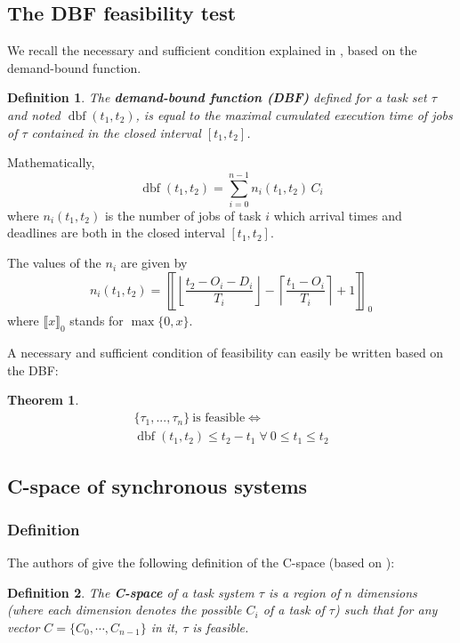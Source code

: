 \documentclass[conference]{IEEEtran}
\newtheorem{theorem}{Theorem}
\newtheorem{definition}{Definition}
\newcommand{\dbf}[1]{\operatorname{dbf}(#1)}
\begin{document}
	\subsection{The DBF feasibility test}

	We recall the necessary and sufficient condition explained in \cite{baruah1999generalized, baruah1990algorithms,pellizzoni2005feasibility}, based on the demand-bound function.

	\begin{definition}
		The \textbf{demand-bound function (DBF)}
		defined for a task set $\tau$ and noted $\dbf{t_1, t_2}$, is equal to
		the maximal cumulated execution time of jobs of $\tau$ contained in the
		closed interval $[t_1, t_2]$.
	\end{definition}

	Mathematically,
	\[
		\dbf{t_1, t_2} = \sum_{i=0}^{n-1} n_i(t_1, t_2) \, C_i
	\]
	where $n_i(t_1, t_2)$ is the number of jobs of task $i$ which arrival times
	and deadlines are both in the closed interval $[t_1, t_2]$.

	The values of the $n_i$ are given by
	\[
		n_i(t_1, t_2) =
		\left\llbracket
			\left\lfloor
				\frac{t_2 - O_i - D_i}{T_i}
			\right\rfloor -
			\left\lceil
				\frac{t_1 - O_i}{T_i}
			\right\rceil + 1
		\right\rrbracket_0
	\]
	where $\llbracket x \rrbracket_0$ stands for $\max \{ 0, x \}$.

	A necessary and sufficient condition of feasibility can easily be written
	based on the DBF:

	\begin{theorem}
	\[
		\begin{array}{c}
			\{\tau_1, ..., \tau_n\} \: \text{is feasible}  \iff \\
			\dbf{t_1, t_2} \leq t_2 - t_1 \; \forall \: 0 \leq t_1 \leq t_2
		\end{array}
	\]
	\end{theorem}

	\subsection{C-space of synchronous systems}

		\subsubsection{Definition}

			The authors of \cite{george2009characterization} give the following definition of the C-space (based on \cite{bini2004schedulability}):
			\begin{definition}
				The \textbf{C-space} of a task system $\tau$ is a region of $n$ dimensions (where each dimension denotes the possible $C_i$ of a task of $\tau$) such that for any vector $C = \{ C_0, \cdots, C_{n-1}\}$ in it, $\tau$ is feasible.
			\end{definition}
\end{document}
